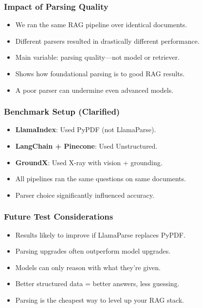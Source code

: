 \begin{frame}[fragile]\frametitle{Impact of Parsing Quality}
  \begin{itemize}
    \item We ran the same RAG pipeline over identical documents.
    \item Different parsers resulted in drastically different performance.
    \item Main variable: parsing quality—not model or retriever.
    \item Shows how foundational parsing is to good RAG results.
    \item A poor parser can undermine even advanced models.
  \end{itemize}
\end{frame}

\begin{frame}[fragile]\frametitle{Benchmark Setup (Clarified)}
  \begin{itemize}
    \item \textbf{LlamaIndex}: Used PyPDF (not LlamaParse).
    \item \textbf{LangChain + Pinecone}: Used Unstructured.
    \item \textbf{GroundX}: Used X-ray with vision + grounding.
    \item All pipelines ran the same questions on same documents.
    \item Parser choice significantly influenced accuracy.
  \end{itemize}
\end{frame}

\begin{frame}[fragile]\frametitle{Future Test Considerations}
  \begin{itemize}
    \item Results likely to improve if LlamaParse replaces PyPDF.
    \item Parsing upgrades often outperform model upgrades.
    \item Models can only reason with what they’re given.
    \item Better structured data = better answers, less guessing.
    \item Parsing is the cheapest way to level up your RAG stack.
  \end{itemize}
\end{frame}

